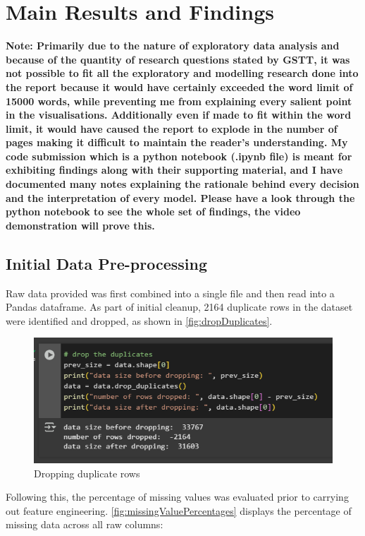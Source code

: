 \section{Main Results and Findings}\label{sec:mainResults}

\noindent \textbf{Note: Primarily due to the nature of exploratory data analysis and because of the quantity of research questions stated by GSTT, it was not possible to fit all the exploratory and modelling research done into the report because it would have certainly exceeded the word limit of 15000 words, while preventing me from explaining every salient point in the visualisations. Additionally even if made to fit within the word limit, it would have caused the report to explode in the number of pages making it difficult to maintain the reader's understanding. My code submission which is a python notebook (.ipynb file) is meant for exhibiting findings along with their supporting material, and I have documented many notes explaining the rationale behind every decision and the interpretation of every model. Please have a look through the python notebook to see the whole set of findings, the video demonstration will prove this.}

\subsection{Initial Data Pre-processing}
\noindent Raw data provided was first combined into a single file and then read into a Pandas dataframe. As part of initial cleanup, 2164 duplicate rows in the dataset were identified and dropped, as shown in \autoref{fig:dropDuplicates}. 

\begin{figure}[H]
		\centering
		\includegraphics[scale=0.8]{figures/python_code/drop_duplicate_rows.png}
		\caption{Dropping duplicate rows}
		\label{fig:dropDuplicates}
\end{figure}

\noindent Following this, the percentage of missing values was evaluated prior to carrying out feature engineering. \autoref{fig:missingValuePercentages} displays the percentage of missing data across all raw columns:

